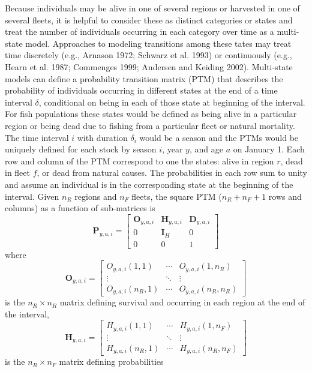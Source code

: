 \documentclass[
]{article}
\begin{document}
Because individuals may be alive in one of several regions or harvested
in one of several fleets, it is helpful to consider these as distinct
categories or states and treat the number of individuals occurring in
each category over time as a multi-state model. Approaches to modeling
transitions among these tates may treat time discretely (e.g., Arnason
1972; Schwarz et al. 1993) or continuously (e.g., Hearn et al. 1987;
Commenges 1999; Andersen and Keiding 2002). Multi-state models can
define a probability transition matrix (PTM) that describes the
probability of individuals occurring in different states at the end of a
time interval \(\delta\), conditional on being in each of those state at
beginning of the interval. For fish populations these states would be
defined as being alive in a particular region or being dead due to
fishing from a particular fleet or natural mortality. The time interval
\(i\) with duration \(\delta_i\) would be a season and the PTMs would be
uniquely defined for each stock by season \(i\), year \(y\), and age
\(a\) on January 1. Each row and column of the PTM correspond to one the
states: alive in region \(r\), dead in fleet \(f\), or dead from natural
causes. The probabilities in each row sum to unity and assume an
individual is in the corresponding state at the beginning of the
interval. Given \(n_R\) regions and \(n_F\) fleets, the square PTM
(\(n_R + n_F + 1\) rows and columns) as a function of sub-matrices is
\begin{equation}\label{eq:ptm}
  \mathbf{P}_{y,a,i} = \begin{bmatrix}
    \mathbf{O}_{y,a,i} & \mathbf{H}_{y,a,i} & \mathbf{D}_{y,a,i} \\
    0 & \mathbf{I}_{H} & 0\\
    0 & 0 & 1
  \end{bmatrix}
\end{equation} where \begin{equation*}
  \mathbf{O}_{y,a,i} = 
  \begin{bmatrix}
    O_{y,a,i}(1,1) & \cdots & O_{y,a,i}(1,n_R) \\
    \vdots & \ddots & \vdots \\
    O_{y,a,i}(n_R,1) & \cdots & O_{y,a,i}(n_R,n_R)
  \end{bmatrix}
\end{equation*} is the \(n_R \times n_R\) matrix defining survival and
occurring in each region at the end of the interval, \begin{equation*} 
  \mathbf{H}_{y,a,i} = 
  \begin{bmatrix}
    H_{y,a,i}(1,1) & \cdots & H_{y,a,i}(1,n_F) \\
    \vdots & \ddots & \vdots \\
    H_{y,a,i}(n_R,1) & \cdots & H_{y,a,i}(n_R,n_F)
  \end{bmatrix}
\end{equation*} is the \(n_R \times n_F\) matrix defining probabilities
\end{document}
